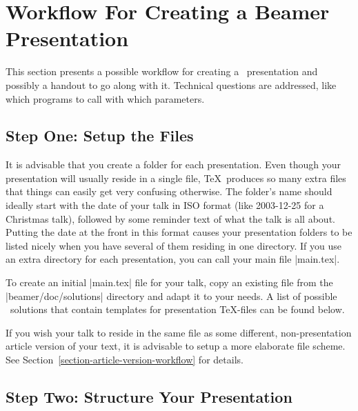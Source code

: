 %
%
%

\section{Workflow For Creating a Beamer Presentation}
\label{section-workflow}

This section presents a possible workflow for creating a \beamer\ presentation and possibly a handout to go along with it. Technical questions are addressed, like which programs to call with which parameters.


\subsection{Step One: Setup the Files}

\beamernote
It is advisable that you create a folder for each presentation. Even though your presentation will usually reside in a single file, \TeX\ produces so many extra files that things can easily get very confusing otherwise. The folder's name should ideally start with the date of your talk in ISO format (like 2003-12-25 for a Christmas talk), followed by some reminder text of what the talk is all about. Putting the date at the front in this format causes your presentation folders to be listed nicely when you have several of them residing in one directory. If you use an extra directory for each presentation, you can call your main file |main.tex|.

To create an initial |main.tex| file for your talk, copy an existing file from the |beamer/doc/solutions| directory and adapt it to your needs. A list of possible \beamer\ solutions that contain templates for presentation \TeX-files can be found below.

If you wish your talk to reside in the same file as some different, non-presentation article version of your text, it is advisable to setup a more elaborate file scheme. See Section~\ref{section-article-version-workflow} for details.

\subsection{Step Two: Structure Your Presentation}

